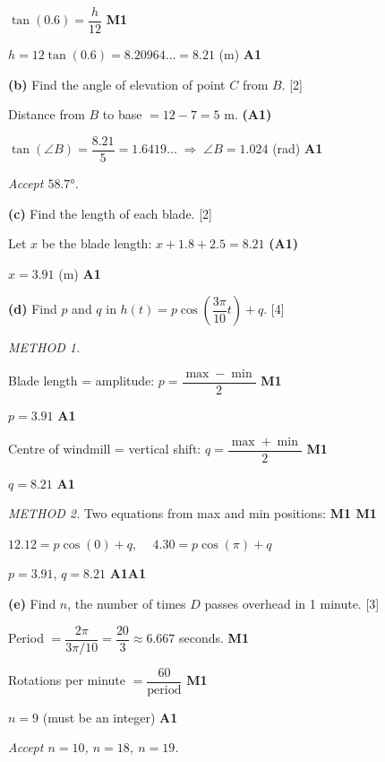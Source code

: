 \documentclass[12pt, twoside]{article}
\begin{document}
\begin{enumerate}[itemsep=0.3cm]
\medskip

$\tan(0.6) = \dfrac{h}{12}$ \hfill \textbf{M1}

$h = 12 \tan(0.6) = 8.20964\ldots = 8.21$ (m) \hfill \textbf{A1}

\medskip

\textbf{(b)} Find the angle of elevation of point $C$ from $B$. \hfill [2]

\medskip

Distance from $B$ to base $= 12 - 7 = 5$ m. \hfill \textbf{(A1)}

$\tan(\angle B) = \dfrac{8.21}{5} = 1.6419\ldots \;\Rightarrow\; \angle B = 1.024$ (rad) \hfill \textbf{A1}

\textit{Accept $58.7°$.}

\medskip

\textbf{(c)} Find the length of each blade. \hfill [2]

\medskip

Let $x$ be the blade length: $x + 1.8 + 2.5 = 8.21$ \hfill \textbf{(A1)}

$x = 3.91$ (m) \hfill \textbf{A1}

\medskip

\textbf{(d)} Find $p$ and $q$ in $h(t) = p\cos\!\left(\dfrac{3\pi}{10}t\right) + q$. \hfill [4]

\medskip

\emph{METHOD 1.}

Blade length = amplitude: $p = \dfrac{\max - \min}{2}$ \hfill \textbf{M1}

$p = 3.91$ \hfill \textbf{A1}

Centre of windmill = vertical shift: $q = \dfrac{\max + \min}{2}$ \hfill \textbf{M1}

$q = 8.21$ \hfill \textbf{A1}

\medskip

\emph{METHOD 2.} Two equations from max and min positions: \hfill \textbf{M1 M1}

$12.12 = p\cos(0) + q$, $\quad 4.30 = p\cos(\pi) + q$

$p = 3.91$, $q = 8.21$ \hfill \textbf{A1A1}

\medskip

\textbf{(e)} Find $n$, the number of times $D$ passes overhead in 1 minute. \hfill [3]

\medskip

Period $= \dfrac{2\pi}{3\pi/10} = \dfrac{20}{3} \approx 6.667$ seconds. \hfill \textbf{M1}

Rotations per minute $= \dfrac{60}{\text{period}}$ \hfill \textbf{M1}

$n = 9$ (must be an integer) \hfill \textbf{A1}

\textit{Accept $n = 10$, $n = 18$, $n = 19$.}

\end{enumerate}
\end{document}
